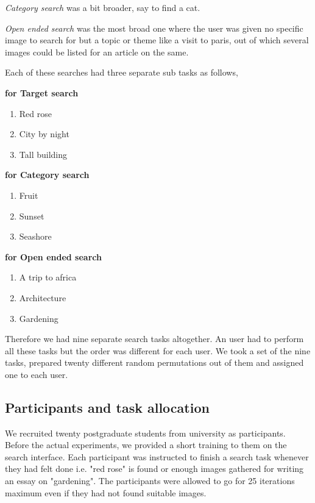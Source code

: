 \documentclass[english]{tktltiki}
\begin{document}
\textit{Category search} was a bit broader, say to find a cat.

\textit{Open ended search} was the most broad one where the user was given no specific image to search for but a topic or theme like a visit to paris, out of which several images could be listed for an article on the same.

Each of these searches had three separate sub tasks as follows,

\textbf{for Target search}

\begin{enumerate}
  \item Red rose
  \item City by night
  \item Tall building
\end{enumerate}

\textbf{for Category search}

\begin{enumerate}
  \item Fruit
  \item Sunset
  \item Seashore
\end{enumerate}

\textbf{for Open ended search}

\begin{enumerate}
  \item A trip to africa
  \item Architecture
  \item Gardening
\end{enumerate}

Therefore we had nine separate search tasks altogether. An user had to perform all these tasks but the order was different for each user. We took a set of the nine tasks, prepared twenty different random permutations out of them and assigned one to each user.

\subsection{Participants and task allocation}

We recruited twenty postgraduate students from university as participants. Before the actual experiments, we provided a short training to them on the search interface. Each participant was instructed to finish a search task whenever they had felt done i.e. "red rose" is found or enough images gathered for writing an essay on "gardening". The participants were allowed to go for 25 iterations maximum even if they had not found suitable images.
\end{document}

